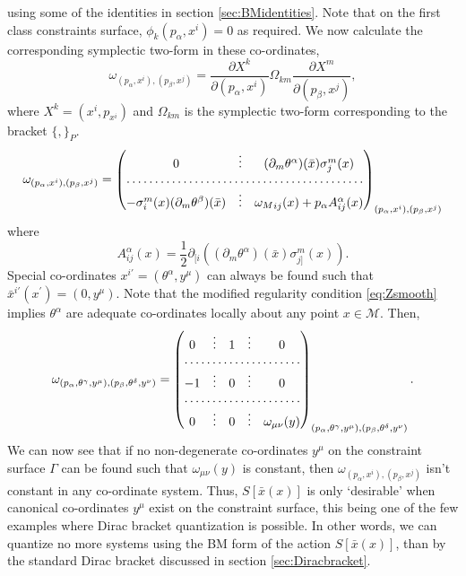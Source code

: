 \documentclass[a4paper,12pt]{article}
\theoremstyle{definition}
\theoremstyle{remark}
\numberwithin{equation}{section}
\newcommand{\al}{\alpha}
\newcommand{\be}{\beta}
\newcommand{\ga}{\gamma}
\newcommand{\de}{\delta}
\newcommand{\om}{\omega}
\newcommand{\si}{\sigma}
\newcommand{\Om}{\Omega}
\newcommand{\M}{\mathcal{M}}
\newcommand{\bx}{\bar{x}}
\newcommand{\pa}{\partial}
\begin{document}
using some of the identities in section \ref{sec:BMidentities}.
Note that on the first class constraints surface,
$\phi_k(p_\al,x^i)=0$ as required. We now calculate the
corresponding symplectic two-form in these co-ordinates,
\begin{equation}
\om_{(p_\al,x^i),(p_\be,x^j)}= \frac{\pa X^k}{\pa(p_\al,x^i)}
\Om_{km} \frac{\pa X^m}{\pa(p_\be,x^j)},
\end{equation}
where $X^k=(x^i,p_{x^i})$ and $\Om_{km}$ is the symplectic two-form
corresponding to the bracket $\{,\}_P$.
\begin{equation}
\om_{(p_\al,x^i),(p_\be,x^j)}=
\begin{pmatrix}
0 & \vdots &(\pa_m \theta^{\al})(\bx) \si^m_j(x) \\
\hdotsfor{3}\\
-\si^m_i(x)(\pa_m \theta^{\be})(\bx) &\vdots & {\om_M}_{ij}(x)+
p_{\al}A^{\al}_{ij}(x)
\end{pmatrix}_{(p_\al,x^i),(p_\be,x^j)}
\end{equation}
where
\begin{equation}
A^{\al}_{ij}(x)=\frac{1}{2}\pa_{[i}((\pa_m \theta^{\al})(\bx)
\si^m_{j]}(x)).
\end{equation}
Special co-ordinates $x^{i\prime}=(\theta^{\al}, y^\mu)$ can
always be found such that $\bx^{i\prime}(x^{\prime})=(0,y^\mu)$.
Note that the modified regularity condition \eqref{eq:Zsmooth}
implies $\theta^\al$ are adequate co-ordinates locally about any
point $x\in \M$. Then,
\begin{equation}
\om_{(p_\al,\theta^\ga ,y^\mu),(p_\be,\theta^\de,y^\nu)}=
\begin{pmatrix}
0 & \vdots & 1 & \vdots & 0\\
\hdotsfor{5}\\
-1 & \vdots & 0 & \vdots & 0\\
\hdotsfor{5}\\
0 & \vdots & 0 & \vdots & \om_{\mu\nu}(y)
\end{pmatrix}_{(p_\al,\theta^\ga ,y^\mu),(p_\be,\theta^\de,y^\nu)}.
\end{equation}
We can now see that if no non-degenerate co-ordinates $y^\mu$ on
the constraint surface $\Gamma$ can be found such that
$\om_{\mu\nu}(y)$ is constant, then $\om_{(p_\al,x^i),(p_\be,x^j)}$
isn't constant in any co-ordinate system. Thus, $S[\bx(x)]$ is only
`desirable' when canonical co-ordinates $y^\mu$ exist on the
constraint surface, this being one of the few examples where Dirac
bracket quantization is possible. In other words, we can quantize
no more systems using the BM form of the action $S[\bx(x)]$, than
by the standard Dirac bracket discussed in section
\ref{sec:Diracbracket}.
\end{document}
